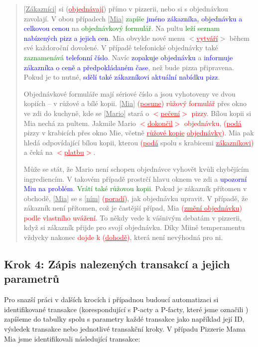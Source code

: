 \begin{quote}
[\underline{Zákazníci}] si (\underline{\textcolor{red}{objednávají}}) přímo v pizzerii, nebo si s objednávkou zavolají. V obou případech [\underline{Mia}] \textcolor{green}{zapíše} \textcolor{blue}{jméno zákazníka, objednávku a celkovou cenou} na \textcolor{green}{objednávkový formulář}. Na pultu \textcolor{green}{leží seznam} \textcolor{blue}{nabízených pizz a jejich cen}. Mia obvykle nové menu $<$\underline{\textcolor{red}{vytváří}}$>$ během své každoroční dovolené. V případě telefonické objednávky také \textcolor{green}{zaznamenává} \textcolor{blue}{telefonní číslo}. Navíc \textcolor{blue}{zopakuje objednávku} a \textcolor{blue}{informuje zákazníka o ceně a předpokládaném čase}, než bude pizza připravena. Pokud je to nutné, \textcolor{blue}{sdělí také zákazníkovi aktuální  nabídku pizz}. 

Objednávkové formuláře mají sériové číslo a jsou vyhotoveny ve dvou kopiích – v růžové a bílé kopii. [\underline{Mia}] \textcolor{red}{(\underline{posune}) růžový formulář} přes okno ve zdi do kuchyně, kde se [\underline{Mario}] stará o \textcolor{red}{$<$\underline{pečení}$>$ pizzy}. Bílou kopii si Mia nechá za pultem. Jakmile Mario \textcolor{red}{$<$\underline{dokončil}$>$ objednávku}, \textcolor{red}{(\underline{podá}} pizzy v krabicích přes okno Mie, včetně \textcolor{red}{\underline{růžové kopie} \underline{objednávky})}. Mia pak hledá odpovídající bílou kopii, kterou \textcolor{red}{(\underline{podá}} spolu s krabicemi \textcolor{red}{\underline{zákazníkovi})} a čeká na \textcolor{red}{$<$\underline{platbu}$>$}. 

Může se stát, že Mario není schopen objednávce vyhovět kvůli chybějícím ingrediencím. V takovém případě prostrčí hlavu oknem ve zdi a \textcolor{blue}{upozorní Miu na problém}. \textcolor{green}{Vrátí také růžovou kopii}. Pokud je zákazník přítomen v obchodě, [\underline{Mia}] se s [\underline{ním}] \textcolor{red}{(\underline{poradí})}, jak objednávku upravit. V případě, že zákazník není přítomen, což je častější případ, Mia \textcolor{red}{(\underline{změní objednávku}) podle vlastního uvážení}. To někdy vede k vášnivým debatám v pizzerii, když si zákazník přijde pro svojí objednávku. Díky Miině temperamentu vždycky nakonec \textcolor{red}{dojde k (\underline{dohodě})}, která není nevýhodná pro ni.
\end{quote}

\subsection{Krok 4: Zápis nalezených transakcí a jejich parametrů}
Pro snazší práci v dalších krocích i případnou budoucí automatizaci si identifikované transakce (korespondující s P-acty a P-facty, které jsme označili ) zapíšeme do tabulky spolu s parametry každé transakce jako například její ID, výsledek transakce nebo jednotlivé transakční kroky. V případu Pizzerie Mama Mia jsme identifikovali následující transakce:

